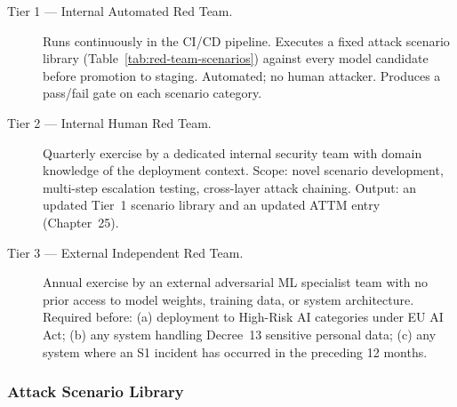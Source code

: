 \begin{description}
  \item[Tier 1 — Internal Automated Red Team.] Runs continuously in the CI/CD pipeline. Executes a fixed attack scenario library (Table~\ref{tab:red-team-scenarios}) against every model candidate before promotion to staging. Automated; no human attacker. Produces a pass/fail gate on each scenario category.
  \item[Tier 2 — Internal Human Red Team.] Quarterly exercise by a dedicated internal security team with domain knowledge of the deployment context. Scope: novel scenario development, multi-step escalation testing, cross-layer attack chaining. Output: an updated Tier~1 scenario library and an updated ATTM entry (Chapter~25).
  \item[Tier 3 — External Independent Red Team.] Annual exercise by an external adversarial ML specialist team with no prior access to model weights, training data, or system architecture. Required before: (a) deployment to High-Risk AI categories under EU AI Act; (b) any system handling Decree~13 sensitive personal data; (c) any system where an S1 incident has occurred in the preceding 12 months.
\end{description}

\subsubsection*{Attack Scenario Library}

